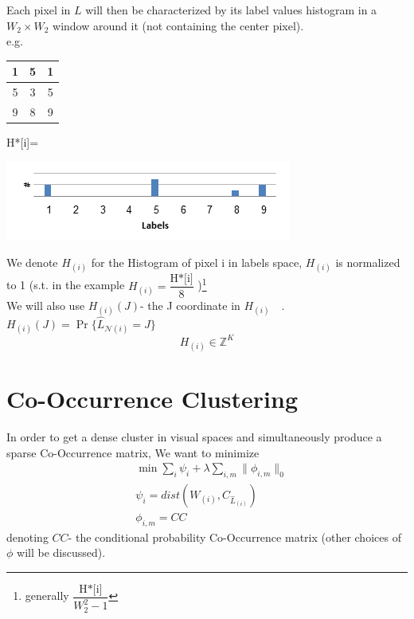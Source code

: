 \documentclass{article}
\begin{document}
Each pixel in $ L $ will then be characterized by its label values histogram in a $W_2\times W_2$ window around it (not containing the center pixel).\\
e.g. 
\begin{multicols}{5}
	\begin{tabular}{|c|c|c|}\hline
		1&5&1\\	\hline
		5&\colorbox{lightred}{3}&5\\ \hline
		9&8&9\\ \hline
	\end{tabular}
	
	\begin{flushright}
		H*[i]=
	\end{flushright}	
	\includegraphics[width=2.2\linewidth]{histogram.png}
\end{multicols}
We denote $ H_{(i)} $ for the Histogram of pixel i in labels space, $ H_{(i)} $  is normalized to 1 (s.t. in the example $ H_{(i)} = \dfrac{\text{H*[i]}}{8}$ )\footnote{generally $\dfrac{\text{H*[i]}}{W_2^2-1}$ }\\
We will also use  $ H_{(i)}(J) $- the J coordinate in $ H_{(i)} \quad $. $ H_{(i)}(J)=\Pr \{\widehat{L}_{\mathcal{N}(i)}=J \} $
\begin{equation*}
H_{(i)}\in \mathbb{Z}^K 
\end{equation*}

\section{Co-Occurrence Clustering}
In order to get a dense cluster in visual spaces and simultaneously produce a sparse Co-Occurrence matrix, We want to minimize
\begin{align}
&\min\sum_i \psi_i +\lambda\sum_{i,m}\lVert\phi_{i,m}\rVert_0 \\
&\psi_i=dist(W_{(i)},C_{\widehat L_(i)}) \nonumber\\
&\phi_{i,m}=CC\nonumber
\end{align}
denoting $ CC $- the conditional probability Co-Occurrence matrix (other choices of $ \phi $ will be discussed).
\end{document}
